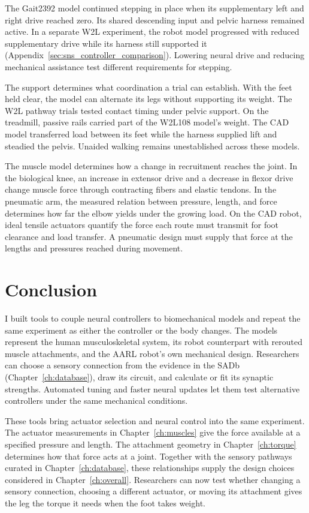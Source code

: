 The Gait2392 model continued stepping in place when its supplementary left and right drive reached zero. Its shared descending input and pelvic harness remained active. In a separate W2L experiment, the robot model progressed with reduced supplementary drive while its harness still supported it (Appendix~\ref{sec:sns_controller_comparison}). Lowering neural drive and reducing mechanical assistance test different requirements for stepping.

The support determines what coordination a trial can establish. With the feet held clear, the model can alternate its legs without supporting its weight. The W2L pathway trials tested contact timing under pelvic support. On the treadmill, passive rails carried part of the W2L108 model's weight. The CAD model transferred load between its feet while the harness supplied lift and steadied the pelvis. Unaided walking remains unestablished across these models.

The muscle model determines how a change in recruitment reaches the joint. In the biological knee, an increase in extensor drive and a decrease in flexor drive change muscle force through contracting fibers and elastic tendons. In the pneumatic arm, the measured relation between pressure, length, and force determines how far the elbow yields under the growing load. On the CAD robot, ideal tensile actuators quantify the force each route must transmit for foot clearance and load transfer. A pneumatic design must supply that force at the lengths and pressures reached during movement.

\section{Conclusion}

I built tools to couple neural controllers to biomechanical models and repeat the same experiment as either the controller or the body changes. The models represent the human musculoskeletal system, its robot counterpart with rerouted muscle attachments, and the AARL robot's own mechanical design. Researchers can choose a sensory connection from the evidence in the SADb (Chapter~\ref{ch:database}), draw its circuit, and calculate or fit its synaptic strengths. Automated tuning and faster neural updates let them test alternative controllers under the same mechanical conditions.

These tools bring actuator selection and neural control into the same experiment. The actuator measurements in Chapter~\ref{ch:muscles} give the force available at a specified pressure and length. The attachment geometry in Chapter~\ref{ch:torque} determines how that force acts at a joint. Together with the sensory pathways curated in Chapter~\ref{ch:database}, these relationships supply the design choices considered in Chapter~\ref{ch:overall}. Researchers can now test whether changing a sensory connection, choosing a different actuator, or moving its attachment gives the leg the torque it needs when the foot takes weight.
